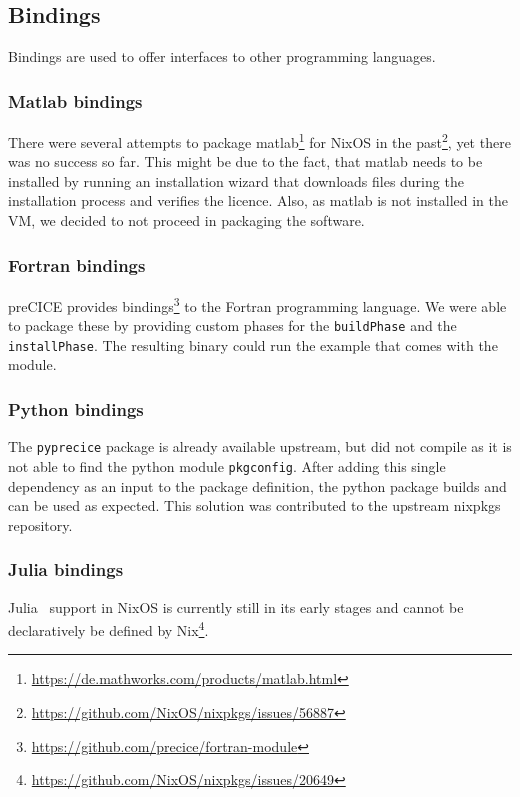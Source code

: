 \documentclass{eceasst}
\begin{document}
\subsection{Bindings}

Bindings are used to offer interfaces to other programming languages.

\subsubsection{Matlab bindings}

There were several attempts to package matlab\footnote{\url{https://de.mathworks.com/products/matlab.html}} for NixOS in the past\footnote{\url{https://github.com/NixOS/nixpkgs/issues/56887}}, yet there was no success so far.
This might be due to the fact, that matlab needs to be installed by running an installation wizard that downloads files during the installation process and verifies the licence.
Also, as matlab is not installed in the VM, we decided to not proceed in packaging the software.

\subsubsection{Fortran bindings}

preCICE provides bindings\footnote{\url{https://github.com/precice/fortran-module}} to the Fortran programming language.
We were able to package these by providing custom phases for the \texttt{buildPhase} and the \texttt{installPhase}.
The resulting binary could run the example that comes with the module.

\subsubsection{Python bindings}

The \texttt{pyprecice} package is already available upstream, but did not compile as it is not able to find the python module \texttt{pkgconfig}.
After adding this single dependency as an input to the package definition, the python package builds and can be used as expected.
This solution was contributed to the upstream nixpkgs repository.

\subsubsection{Julia bindings}

Julia~\cite{bezanson2017julia} support in NixOS is currently still in its early stages and cannot be declaratively be defined by Nix\footnote{\url{https://github.com/NixOS/nixpkgs/issues/20649}}.
\end{document}
